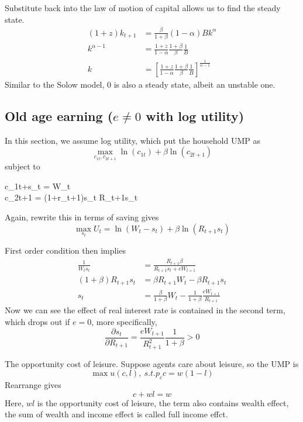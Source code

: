 \documentclass[twocolumn, fleqn]{article}
\begin{document}
				Substitute back into the law of motion of capital allows us to find the steady state.
				\begin{align*}
					(1+z)k_{t+1} &= \frac{\beta}{1+\beta}(1-\alpha)Bk^\alpha\\
					k^{\alpha - 1} &= \frac{1+z}{1-\alpha} \frac{1+\beta}{\beta} \frac{1}{B}\\
					k &= \left[ \frac{1+z}{1-\alpha} \frac{1+\beta}{\beta} \frac{1}{B} \right]^{\frac{1}{\alpha -1}}
				\end{align*}
				Similar to the Solow model, 0 is also a steady state, albeit an unstable one.

		\subsection{Old age earning ($e\neq 0$ with log utility)}\label{subsec:old-age-earning}

			In this section, we assume log utility, which put the household UMP as
			\[\max_{c_{1t},c_{2t+1}}\ln(c_{1t})+\beta \ln (c_{2t+1})\]
			subject to
			\begin{cases}
				c_{1t}+s_{t} = W_t\\
				c_{2t+1} = (1+r_{t+1})s_t \equiv R_{t+1}s_t
			\end{cases}
			Again, rewrite this in terms of saving gives \[\max_{s_t} U_t=\ln(W_t - s_t) + \beta \ln(R_{t+1}s_t)\]

			First order condition then implies
			\begin{align*}
				\frac{1}{W_t s_t} &= \frac{R_{t+1}\beta}{R_{t+1}s_t + e W_{t+1}}\\
				(1+\beta)R_{t+1}s_t &= \beta R_{t+1}W_t - \beta R_{t+1}s_t\\
				s_t &= \frac{\beta}{1+\beta}W_t - \frac{1}{1+\beta}\frac{e W_{t+1}}{R_{t+1}}
			\end{align*}
			Now we can see the effect of real interest rate is contained in the second term, which drops out if $e=0$, more specifically,
			\[\frac{\partial s_t}{\partial R_{t+1}} = \frac{e W_{t+1}}{R_{t+1}^2}\frac{1}{1+\beta}>0\]

			\begin{note}
				The opportunity cost of leisure.
				Suppose agents care about leisure, so the UMP is \[\max u(c,l), \ s.t. p_c c = w(1-l) \]
				Rearrange gives \[c+wl = w\]
				Here, $wl$ is the opportunity cost of leisure, the term also contains wealth effect, the sum of
				wealth and income effect is called full income effct.
			\end{note}
\end{document}
